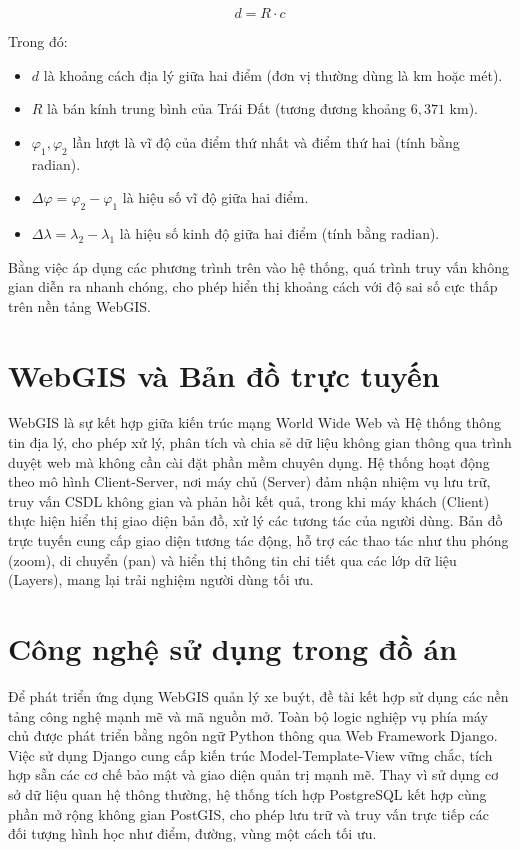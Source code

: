 \begin{equation}
    d = R \cdot c
\end{equation}

Trong đó:
\begin{itemize}
    \item $d$ là khoảng cách địa lý giữa hai điểm (đơn vị thường dùng là km hoặc mét).
    \item $R$ là bán kính trung bình của Trái Đất (tương đương khoảng $6,371$ km).
    \item $\varphi_1, \varphi_2$ lần lượt là vĩ độ của điểm thứ nhất và điểm thứ hai (tính bằng radian).
    \item $\Delta\varphi = \varphi_2 - \varphi_1$ là hiệu số vĩ độ giữa hai điểm.
    \item $\Delta\lambda = \lambda_2 - \lambda_1$ là hiệu số kinh độ giữa hai điểm (tính bằng radian).
\end{itemize}

Bằng việc áp dụng các phương trình trên vào hệ thống, quá trình truy vấn không gian diễn ra nhanh chóng, cho phép hiển thị khoảng cách với độ sai số cực thấp trên nền tảng WebGIS.

\section{WebGIS và Bản đồ trực tuyến}

WebGIS là sự kết hợp giữa kiến trúc mạng World Wide Web và Hệ thống thông tin địa lý, cho phép xử lý, phân tích và chia sẻ dữ liệu không gian thông qua trình duyệt web mà không cần cài đặt phần mềm chuyên dụng. Hệ thống hoạt động theo mô hình Client-Server, nơi máy chủ (Server) đảm nhận nhiệm vụ lưu trữ, truy vấn CSDL không gian và phản hồi kết quả, trong khi máy khách (Client) thực hiện hiển thị giao diện bản đồ, xử lý các tương tác của người dùng. Bản đồ trực tuyến cung cấp giao diện tương tác động, hỗ trợ các thao tác như thu phóng (zoom), di chuyển (pan) và hiển thị thông tin chi tiết qua các lớp dữ liệu (Layers), mang lại trải nghiệm người dùng tối ưu.

\section{Công nghệ sử dụng trong đồ án}

Để phát triển ứng dụng WebGIS quản lý xe buýt, đề tài kết hợp sử dụng các nền tảng công nghệ mạnh mẽ và mã nguồn mở. Toàn bộ logic nghiệp vụ phía máy chủ được phát triển bằng ngôn ngữ Python thông qua Web Framework Django. Việc sử dụng Django cung cấp kiến trúc Model-Template-View vững chắc, tích hợp sẵn các cơ chế bảo mật và giao diện quản trị mạnh mẽ. Thay vì sử dụng cơ sở dữ liệu quan hệ thông thường, hệ thống tích hợp PostgreSQL kết hợp cùng phần mở rộng không gian PostGIS, cho phép lưu trữ và truy vấn trực tiếp các đối tượng hình học như điểm, đường, vùng một cách tối ưu.

